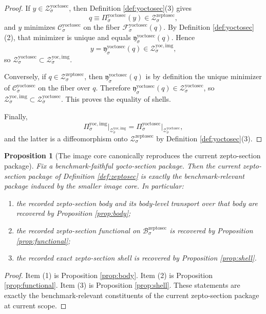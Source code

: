 \documentclass[11pt]{article}
\newcommand{\ZeptoSectionBody}[1]{\mathcal B_{#1}^{\mathrm{zeptosec}}}
\newcommand{\ZeptoSectionShell}[1]{\mathcal Z_{#1}^{\mathrm{zeptosec}}}
\newcommand{\YoctoSectionProj}[1]{\Pi_{#1}^{\mathrm{yoctosec}}}
\newcommand{\YoctoSectionFiber}[2]{\mathcal F_{#1}^{\mathrm{yoctosec}}(#2)}
\newcommand{\YoctoSectionZeptoMin}[1]{\mathfrak y_{#1}^{\mathrm{yoctosec}}}
\newcommand{\YoctoSectionFunctional}[1]{\mathscr C_{#1}^{\mathrm{yoctosec}}}
\newcommand{\YoctoSectionShell}[1]{\mathcal Z_{#1}^{\mathrm{yoctosec}}}
\newcommand{\YoctoImgProj}[1]{\Pi_{#1}^{\mathrm{yoc,img}}}
\newcommand{\YoctoImgShell}[1]{\mathcal Z_{#1}^{\mathrm{yoc,img}}}
\newtheorem{proposition}{Proposition}
\begin{document}
\begin{proof}
If \(y\in\YoctoSectionShell{\sigma}\), then Definition \ref{def:yoctosec}(3) gives
\[
q\equiv \YoctoSectionProj{\sigma}(y)\in\ZeptoSectionShell{\sigma},
\]
and \(y\) minimizes \(\YoctoSectionFunctional{\sigma}\) on the fiber \(\YoctoSectionFiber{\sigma}{q}\). By Definition \ref{def:yoctosec}(2), that minimizer is unique and equals \(\YoctoSectionZeptoMin{\sigma}(q)\). Hence
\[
y=\YoctoSectionZeptoMin{\sigma}(q)\in\YoctoImgShell{\sigma},
\]
so \(\YoctoSectionShell{\sigma}\subset\YoctoImgShell{\sigma}\).

Conversely, if \(q\in\ZeptoSectionShell{\sigma}\), then \(\YoctoSectionZeptoMin{\sigma}(q)\) is by definition the unique minimizer of \(\YoctoSectionFunctional{\sigma}\) on the fiber over \(q\). Therefore \(\YoctoSectionZeptoMin{\sigma}(q)\in\YoctoSectionShell{\sigma}\), so \(\YoctoImgShell{\sigma}\subset\YoctoSectionShell{\sigma}\). This proves the equality of shells.

Finally,
\[
\YoctoImgProj{\sigma}\big|_{\YoctoImgShell{\sigma}}
=
\YoctoSectionProj{\sigma}\big|_{\YoctoSectionShell{\sigma}},
\]
and the latter is a diffeomorphism onto \(\ZeptoSectionShell{\sigma}\) by Definition \ref{def:yoctosec}(3).
\end{proof}

\begin{proposition}[The image core canonically reproduces the current zepto-section package]
\label{prop:package}
Fix a benchmark-faithful yocto-section package. Then the current zepto-section package of Definition \ref{def:zeptosec} is exactly the benchmark-relevant package induced by the smaller image core. In particular:
\begin{enumerate}
    \item the recorded zepto-section body and its body-level transport over that body are recovered by Proposition \ref{prop:body};
    \item the recorded zepto-section functional on \(\ZeptoSectionBody{\sigma}\) is recovered by Proposition \ref{prop:functional};
    \item the recorded exact zepto-section shell is recovered by Proposition \ref{prop:shell}.
\end{enumerate}
\end{proposition}

\begin{proof}
Item (1) is Proposition \ref{prop:body}. Item (2) is Proposition \ref{prop:functional}. Item (3) is Proposition \ref{prop:shell}. These statements are exactly the benchmark-relevant constituents of the current zepto-section package at current scope.
\end{proof}
\end{document}

